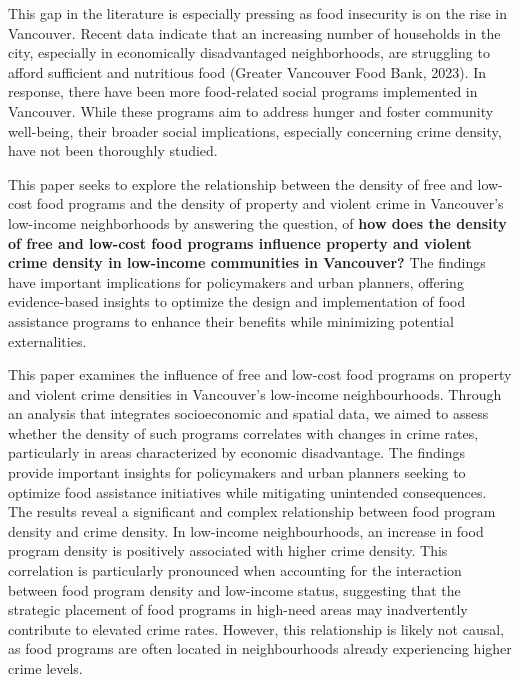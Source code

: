 \documentclass[AEJ]{AEA}
\begin{document}
This gap in the literature is especially pressing as food insecurity is
on the rise in Vancouver. Recent data indicate that an increasing number
of households in the city, especially in economically disadvantaged
neighborhoods, are struggling to afford sufficient and nutritious food
(Greater Vancouver Food Bank, 2023). In response, there have been more
food-related social programs implemented in Vancouver. While these
programs aim to address hunger and foster community well-being, their
broader social implications, especially concerning crime density, have
not been thoroughly studied.

This paper seeks to explore the relationship between the density of free
and low-cost food programs and the density of property and violent crime
in Vancouver’s low-income neighborhoods by answering the question, of \textbf{how
does the density of free and low-cost food programs influence property
and violent crime density in low-income communities in Vancouver?} The
findings have important implications for policymakers and urban
planners, offering evidence-based insights to optimize the design and
implementation of food assistance programs to enhance their benefits
while minimizing potential externalities.

This paper examines the influence of free and low-cost food programs on property and violent crime densities in Vancouver’s low-income neighbourhoods. Through an analysis that integrates socioeconomic and spatial data, we aimed to assess whether the density of such programs correlates with changes in crime rates, particularly in areas characterized by economic disadvantage. The findings provide important insights for policymakers and urban planners seeking to optimize food assistance initiatives while mitigating unintended consequences. The results reveal a significant and complex relationship between food program density and crime density. In low-income neighbourhoods, an increase in food program density is positively associated with higher crime density. This correlation is particularly pronounced when accounting for the interaction between food program density and low-income status, suggesting that the strategic placement of food programs in high-need areas may inadvertently contribute to elevated crime rates. However, this relationship is likely not causal, as food programs are often located in neighbourhoods already experiencing higher crime levels.
\end{document}
